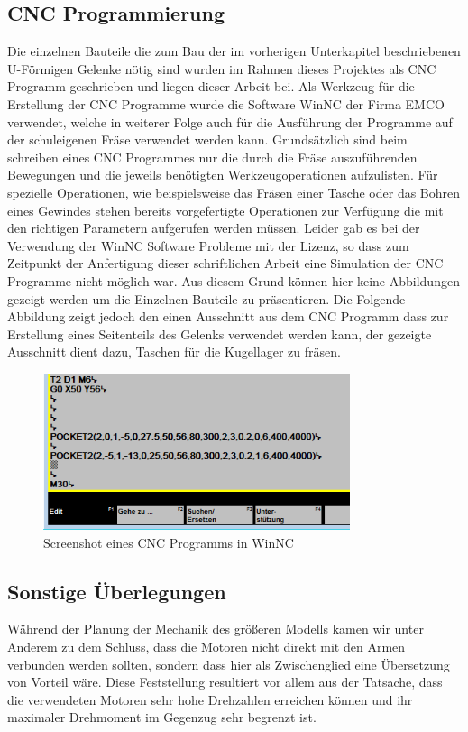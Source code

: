 \subsection{CNC Programmierung}
Die einzelnen Bauteile die zum Bau der im vorherigen Unterkapitel beschriebenen U-Förmigen Gelenke nötig sind wurden im Rahmen dieses Projektes als CNC Programm geschrieben und liegen dieser Arbeit bei. Als Werkzeug für die Erstellung der CNC Programme wurde die Software WinNC der Firma EMCO verwendet, welche in weiterer Folge auch für die Ausführung der Programme auf der schuleigenen Fräse verwendet werden kann. 
Grundsätzlich sind beim schreiben eines CNC Programmes nur die durch die Fräse auszuführenden Bewegungen und die jeweils benötigten Werkzeugoperationen aufzulisten. Für spezielle Operationen, wie beispielsweise das Fräsen einer Tasche oder das Bohren eines Gewindes stehen bereits vorgefertigte Operationen zur Verfügung die mit den richtigen Parametern aufgerufen werden müssen.
Leider gab es bei der Verwendung der WinNC Software Probleme mit der Lizenz, so dass zum Zeitpunkt der Anfertigung dieser schriftlichen Arbeit eine Simulation der CNC Programme nicht möglich war. Aus diesem Grund können hier keine Abbildungen gezeigt werden um die Einzelnen Bauteile zu präsentieren. Die Folgende Abbildung zeigt jedoch den einen Ausschnitt aus dem CNC Programm dass zur Erstellung eines Seitenteils des Gelenks verwendet werden kann, der gezeigte Ausschnitt dient dazu, Taschen für die Kugellager zu fräsen.

\begin{figure}[H]
\centering
\includegraphics[width=9cm]{images/cncprogramm}
\caption{Screenshot eines CNC Programms in WinNC}
\end{figure}

\subsection{Sonstige Überlegungen}
Während der Planung der Mechanik des größeren Modells kamen wir unter Anderem zu dem Schluss, dass die Motoren nicht direkt mit den Armen verbunden werden sollten, sondern dass hier als Zwischenglied eine Übersetzung von Vorteil wäre. Diese Feststellung resultiert vor allem aus der Tatsache, dass die verwendeten Motoren sehr hohe Drehzahlen erreichen können und ihr maximaler Drehmoment im Gegenzug sehr begrenzt ist.
